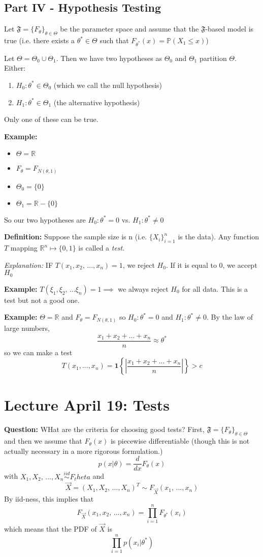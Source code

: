 \documentclass[12pt]{article}
\renewcommand{\P}{\mathbb{P}}
\newcommand{\R}{\mathbb{R}}
\begin{document}
\subsection*{Part IV - Hypothesis Testing}
Let $\mathfrak{F} = \{F_\theta\}_{\theta \in \Theta}$ be the parameter space and assume that the $\mathfrak{F}$-based model is true (i.e. there exists a $\theta^* \in \Theta$ such that $F_{\theta^*}(x) = \P(X_1 \leq x)$) 

Let $\Theta = \Theta_0 \cup \Theta_1$. Then we have two hypotheses as $\Theta_0$ and $\Theta_1$ partition $\Theta$. 
Either:
\begin{enumerate}
    \item $H_0: \theta^* \in \Theta_0$ (which we call the null hypothesis)
    \item $H_1:\theta^* \in \Theta_1$ (the alternative hypothesis)
\end{enumerate}

Only one of these can be true. 

\textbf{Example:} 
\begin{itemize}
    \item $\Theta = \R$
    \item $F_\theta = F_{N(\theta,1)}$
    \item $\Theta_0 = \{0\}$
    \item $\Theta_1 = \R - \{0\}$
\end{itemize}
So our two hypotheses are $H_0: \theta^* = 0$ vs. $H_1 : \theta^* \neq 0$

\textbf{Definition:} Suppose the sample size is n (i.e. $\{X_i\}_{i=1}^n$ is the data). Any function $T$ mapping $\R^n \mapsto \{0, 1\}$ is called a \emph{test}. 

\emph{Explanation:} IF $T(x_1, x_2, \, ..., x_n) = 1$, we reject $H_0$. If it is equal to 0, we accept $H_0$

\textbf{Example:} $T(\xi_1, \xi_2, \, ... \xi_n) =1 \implies$ we always reject $H_0$ for all data. This is a test but not a good one. 

\textbf{Example:} $\Theta = \R$ and $F_\theta = F_{N(\theta, 1)}$ so $H_0 : \theta^* = 0$ and $H_1 : \theta^* \neq 0$. By the law of large numbers, 
\[\frac{x_1 + x_2 + ... + x_n}{n} \approx \theta^*\] 
so we can make a test 
\[T(x_1, ..., x_n) = \mathbf{1}\left\{|\frac{x_1 + x_2 + ... + x_n}{n}|\right\} > c\]

\section*{Lecture April 19: Tests}
\textbf{Question:} WHat are the criteria for choosing good tests?
First, $\mathfrak{F} = \{F_\theta\}_{\theta \in \Theta}$ and then we assume that $F_\theta(x)$ is piecewise differentiable (though this is not actually necessary in a more rigorous formulation.)
\[p(x | \theta) = \frac{d}{dx}F_\theta(x)\]
with $X_1, X_2, \, ..., X_n \overset{iid}{\sim} F_theta$ and
\[\vec{X} = (X_1, X_2, \, ..., X_n)^T \sim F_{\vec{X}}(x_1, \, ..., x_n)\]
By iid-ness, this implies that 
\[F_{\vec{X}}(x_1, x_2, \, ..., x_n) = \prod_{i=1}^n F_{\theta^*}(x_i)\]
which means that the PDF of $\vec{X}$ is 
\[\prod_{i=1}^n p(x_i | \theta^*)\]
\end{document}
